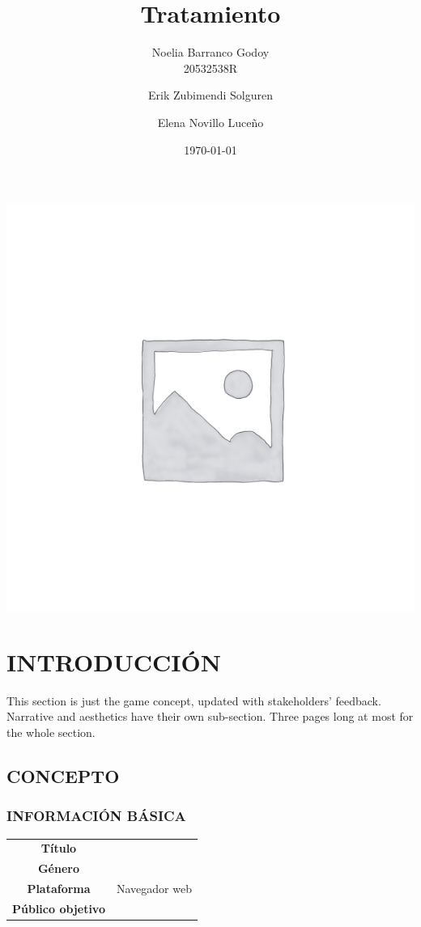 \documentclass{article}
\title{Tratamiento} %
\author{Noelia Barranco Godoy \\ 20532538R
\and Erik Zubimendi Solguren \and Elena Novillo Luceño} %
\date{\today} %
\begin{document}
    \begin{titlepage}
        \maketitle
        \thispagestyle{empty}
        \begin{center}
            \includegraphics[scale=0.5]{placeholder.png} %
        \end{center} 
    \end{titlepage}
        

        
    \tableofcontents
    \newpage
    
    \section{INTRODUCCIÓN}
    This section is just the game concept, updated with stakeholders’ feedback. Narrative and aesthetics have their own sub-section. Three pages long at most for the whole section.

    \subsection{CONCEPTO}
    \subsubsection{INFORMACIÓN BÁSICA}
    \begin{tabular}{||c|c||}
        \hline
        \textbf{Título} & \\
        \textbf{Género} & \\
        \textbf{Plataforma} & Navegador web\\
        \textbf{Público objetivo} & \\
        \hline
    \end{tabular}
\end{document}
